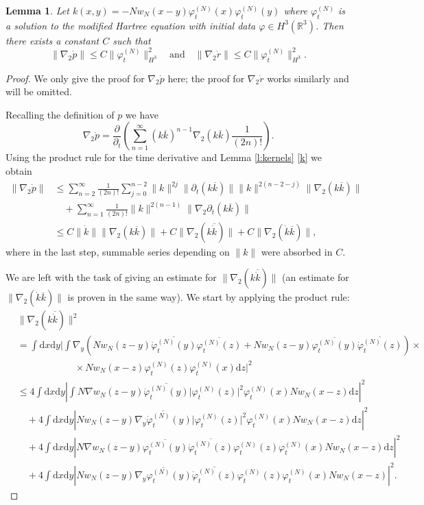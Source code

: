 \documentclass[11pt,a4paper,draft,DIV11]{scrartcl}	%
\newtheorem{lem}[thm]{Lemma}
\newcommand{\di}{\textrm{d}}		%
\newcommand{\cc}[1]{\overline{#1}}	%
\newcommand{\Rbb}{\mathbb{R}}		%
\newcommand{\norm}[1]{\lVert#1\rVert}	%
\newcommand{\ph}{\varphi_t^{(N)}}	%
\newcommand{\phdot}{\dot{\varphi}_t^{(N)}}	%
\newcommand{\gradone}{\nabla_2}
\newcommand{\bd}{\begin{displaymath}}			%
\newcommand{\ed}{\end{displaymath}}
\begin{document}
\begin{lem}
\label{lem:dottedests3}
Let $k(x,y) = -N w_N(x-y) \ph(x)\ph(y)$ where $\ph$ is a solution to the modified Hartree equation with initial data $\varphi \in H^3(\Rbb^3)$. Then there exists a constant $C$ such that
\bd
\norm{\gradone \dot p} \leq C \norm{\ph}_{H^3}^2 \quad \mbox{and} \quad \norm{\gradone \dot r} \leq C \norm{\ph}_{H^3}^2.
\ed
\end{lem}
\begin{proof}
We only give the proof for $\gradone \dot p$ here; the proof for $\gradone \dot r$ works similarly and will be omitted.

Recalling the definition of $p$ we have
\bd
\gradone \dot p = \frac{\partial}{\partial_t} \left( \sum_{n=1}^\infty (k \cc k)^{n-1} \gradone(k \cc k) \frac{1}{(2n)!} \right).
\ed
Using the product rule for the time derivative and Lemma \ref{l:kernels} \ref{k} we obtain
\begin{align*}
\norm{\gradone \dot p} & \leq \sum_{n=2}^\infty \frac{1}{(2n)!} \sum_{j=0}^{n-2} \norm{k}^{2j} \norm{\partial_t(k \cc k)} \norm{k}^{2(n-2-j)} \norm{\gradone (k \cc k)} \\
& \quad + \sum_{n=1}^\infty \frac{1}{(2n)!} \norm{k}^{2(n-1)} \norm{\gradone \partial_t (k \cc k)} \\
& \leq C \norm{\dot k} \norm{\gradone(k \cc k)} + C \norm{\gradone(k \cc{\dot k})} + C \norm{\gradone (\dot k \cc k)},
\end{align*}
where in the last step, summable series depending on $\norm{k}$ were absorbed in $C$.

We are left with the task of giving an estimate for $\norm{\gradone(k \cc{\dot k})}$ (an estimate for $\norm{\gradone (\dot k \cc k)}$ is proven in the same way). We start by applying the product rule:
\begin{align}
& \norm{\gradone(k \cc{\dot k})}^2 \nonumber \\
& = \int \di x \di y \bigg\lvert \int \nabla_y\left( N w_N(z-y) \cc{\phdot(y)} \cc{\ph(z)} + N w_N(z-y) \cc{\ph(y)} \cc{\phdot(z)} \right) \times \nonumber \\
& \qquad\qquad\qquad \times N w_N(x-z) {\ph(z)} {\ph(x)} \di z \bigg\rvert^2 \nonumber \\
& \leq 4 \int \di x \di y \left\lvert \int N \nabla w_N(z-y) \cc{\phdot(y)} \lvert\ph(z)\rvert^2 {\ph(x)} N w_N(x-z) \di z \right\rvert^2 \label{eq:kk1} \\
& \quad + 4 \int \di x \di y \left\lvert N w_N(z-y) \cc{\nabla_y \phdot(y)} \lvert \ph(z)\rvert^2 {\ph(x)} N w_N(x-z) \di z \right\rvert^2 \label{eq:kk2}\\
& \quad + 4 \int \di x \di y \left\lvert N \nabla w_N(z-y) \cc{\ph(y)} \cc{\phdot(z)} {\ph(z)} {\ph(x)} N w_N(x-z) \di z \right\rvert^2 \label{eq:kk3}\\
& \quad + 4 \int \di x \di y \left\lvert N w_N(z-y) \cc{\nabla_y \ph(y)} \cc{\phdot(z)} {\ph(z)} {\ph(x)} N w_N(x-z) \right\rvert^2. \label{eq:kk4}
\end{align}


\end{proof}
\end{document}
